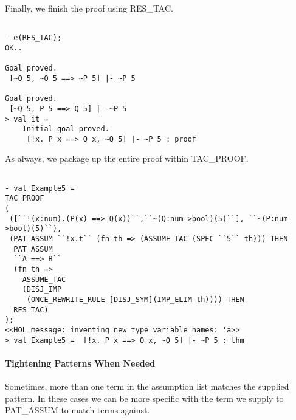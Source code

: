 Finally, we finish the proof using RES\_TAC.
\begin{session}
  \begin{scriptsize}
\begin{verbatim}

- e(RES_TAC);
OK..

Goal proved.
 [~Q 5, ~Q 5 ==> ~P 5] |- ~P 5

Goal proved.
 [~Q 5, P 5 ==> Q 5] |- ~P 5
> val it =
    Initial goal proved.
     [!x. P x ==> Q x, ~Q 5] |- ~P 5 : proof
\end{verbatim}
  \end{scriptsize}
\end{session}
As always, we package up the entire proof within TAC\_PROOF.
\begin{session}
  \begin{scriptsize}
\begin{verbatim}

- val Example5 =
TAC_PROOF
(
 ([``!(x:num).(P(x) ==> Q(x))``,``~(Q:num->bool)(5)``], ``~(P:num->bool)(5)``),
 (PAT_ASSUM ``!x.t`` (fn th => (ASSUME_TAC (SPEC ``5`` th))) THEN
  PAT_ASSUM 
  ``A ==> B`` 
  (fn th => 
    ASSUME_TAC 
    (DISJ_IMP 
     (ONCE_REWRITE_RULE [DISJ_SYM](IMP_ELIM th)))) THEN
  RES_TAC)
);
<<HOL message: inventing new type variable names: 'a>>
> val Example5 =  [!x. P x ==> Q x, ~Q 5] |- ~P 5 : thm
\end{verbatim}
  \end{scriptsize}
\end{session}

\paragraph*{Tightening Patterns When Needed}

Sometimes, more than one term in the assumption list matches the
supplied pattern. In these cases we can be more specific with the term
we supply to PAT\_ASSUM to match terms against.

